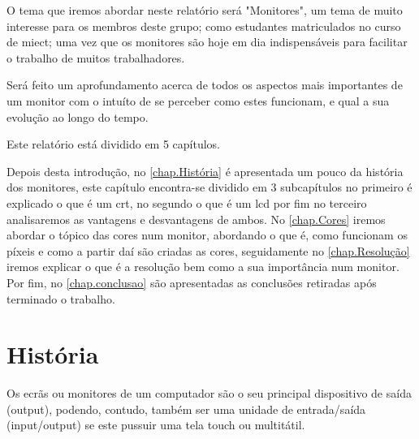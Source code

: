 \documentclass[a4paper]{report}
\begin{document}
O tema que iremos abordar neste relatório será "Monitores", um tema de muito interesse para os membros deste grupo; como estudantes matriculados no curso de \ac{miect}; uma vez que os monitores são hoje em dia indispensáveis para facilitar o trabalho de muitos trabalhadores.

Será feito um aprofundamento acerca de todos os aspectos mais importantes de um monitor com o intuíto de se perceber como estes funcionam, e qual a sua evolução ao longo do tempo.

Este relatório está dividido em 5 capítulos.

Depois desta introdução, no \autoref{chap.História} é apresentada um pouco da história dos monitores, este capítulo encontra-se dividido em 3 subcapítulos no primeiro é explicado o que é um \ac{crt}, no segundo o que é um \ac{lcd} por fim no terceiro analisaremos as vantagens e desvantagens de ambos. No \autoref{chap.Cores} iremos abordar o tópico das cores num monitor, abordando o que é, como funcionam os píxeis e como a partir daí são criadas as cores, seguidamente no \autoref{chap.Resolução} iremos explicar o que é a resolução bem como a sua importância num monitor. Por fim, no \autoref{chap.conclusao} são apresentadas as conclusões retiradas após terminado o trabalho.

\chapter{História}
\label{chap.História}

Os ecrãs ou monitores de um computador são o seu principal dispositivo de saída (output), podendo, contudo, também ser uma unidade de entrada/saída (input/output) se este pussuir uma tela touch ou multitátil.
\end{document}
